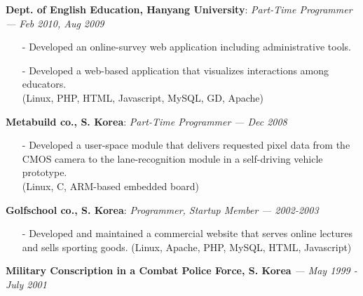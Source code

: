 {\bf Dept. of English Education, Hanyang University}: \emph{Part-Time Programmer}
{\it \footnotesize --- Feb 2010, Aug 2009}
\begin{itemize}[leftmargin=*]
\setlength\itemsep{-0.02in}
 \item[-] Developed an online-survey web application including administrative tools.
 \item[-] Developed a web-based application that visualizes interactions among educators.
          \\
          {\small(Linux, PHP, HTML, Javascript, MySQL, GD, Apache)}
\end{itemize}
\vspace{-0.15in}

{\bf Metabuild co., S. Korea}: \emph{Part-Time Programmer}
{\it \footnotesize --- Dec 2008}
\begin{itemize}[leftmargin=*]
\setlength\itemsep{-0.02in}
 \item[-] Developed a user-space module that delivers requested pixel data from the CMOS camera
          to the lane-recognition module in a self-driving vehicle prototype.\\
          {\small(Linux, C, ARM-based embedded board)}
\end{itemize}
\vspace{-0.15in}

{\bf Golfschool co., S. Korea}: \emph{Programmer, Startup Member}
{\it \footnotesize --- 2002-2003}
\begin{itemize}[leftmargin=*]
\setlength\itemsep{-0.02in}
 \item[-] Developed and maintained a commercial website that serves online lectures and sells sporting goods.
          {\small(Linux, Apache, PHP, MySQL, HTML, Javascript)}
\end{itemize}
\vspace{-0.15in}

{\bf Military Conscription in a Combat Police Force, S. Korea}
{\it \footnotesize --- May 1999 - July 2001}

